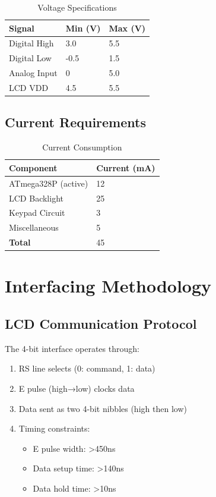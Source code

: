 \documentclass{article}
\begin{document}
\begin{table}[h]
\centering
\caption{Voltage Specifications}
\begin{tabular}{|l|l|l|}
\hline
\textbf{Signal} & \textbf{Min (V)} & \textbf{Max (V)} \\
\hline
Digital High & 3.0 & 5.5 \\
Digital Low & -0.5 & 1.5 \\
Analog Input & 0 & 5.0 \\
LCD VDD & 4.5 & 5.5 \\
\hline
\end{tabular}
\end{table}

\subsection{Current Requirements}

\begin{table}[h]
\centering
\caption{Current Consumption}
\begin{tabular}{|l|l|}
\hline
\textbf{Component} & \textbf{Current (mA)} \\
\hline
ATmega328P (active) & 12 \\
LCD Backlight & 25 \\
Keypad Circuit & 3 \\
Miscellaneous & 5 \\
\hline
\textbf{Total} & 45 \\
\hline
\end{tabular}
\end{table}

\section{Interfacing Methodology}
\subsection{LCD Communication Protocol}

The 4-bit interface operates through:
\begin{enumerate}
\item RS line selects (0: command, 1: data)
\item E pulse (high→low) clocks data
\item Data sent as two 4-bit nibbles (high then low)
\item Timing constraints:
  \begin{itemize}
  \item E pulse width: >450ns
  \item Data setup time: >140ns
  \item Data hold time: >10ns
  \end{itemize}
\end{enumerate}
\end{document}
